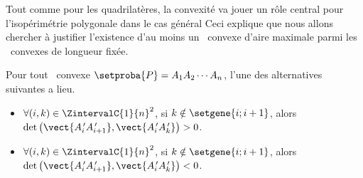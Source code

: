 Tout comme pour les quadrilatères, la convexité va jouer un rôle central pour l’isopérimétrie polygonale dans le cas général
%
Ceci explique que nous allons chercher à justifier l'existence d'au moins un \ngone\ convexe d'aire maximale parmi les \ngones\ convexes de longueur fixée.




\begin{fact} \label{conv-pos-det}
    Pour tout \ngone\ convexe $\setproba{P} = A_1 A_2 \cdots A_n$, l'une des alternatives suivantes a lieu.
	\begin{itemize}
		\item $\forall (i, k) \in \ZintervalC{1}{n}^2$,
		si $k \notin \setgene{i ; i+1}$, alors
		$\det \big( \vect{\primeit{A}_i \primeit{A}_{i+1}}, \vect{\primeit{A}_i \primeit{A}_k} \big) > 0$.

		\item $\forall (i, k) \in \ZintervalC{1}{n}^2$,
		si $k \notin \setgene{i ; i+1}$, alors
		$\det \big( \vect{\primeit{A}_i \primeit{A}_{i+1}}, \vect{\primeit{A}_i \primeit{A}_k} \big) < 0$.
    \end{itemize}
\end{fact}


